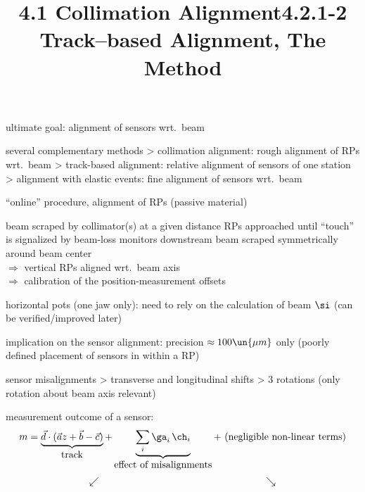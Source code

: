 \> ultimate goal: alignment of sensors wrt.\ beam

\vfil

\> several complementary methods
\>> collimation alignment: rough alignment of RPs wrt.~beam
\>> track-based alignment: relative alignment of sensors of one station
\>> alignment with elastic events: fine alignment of sensors wrt.~beam

\newpage%
\title{4.1 Collimation Alignment}

\> ``online'' procedure, alignment of RPs (passive material)

\> beam scraped by collimator(s) at a given distance
\> RPs approached until ``touch'' is signalized by beam-loss monitors downstream
\> beam scraped symmetrically around beam center\\
$\Rightarrow$ vertical RPs aligned wrt.~beam axis\\
$\Rightarrow$ calibration of the position-measurement offsets


\> horizontal pots (one jaw only): need to rely on the calculation of beam $\si$ (can be verified/improved later)

\> implication on the sensor alignment: precision $\approx 100\un{\mu m}$ only (poorly defined placement of sensors in within a RP)

\newpage%
\title{4.2.1-2 Track--based Alignment, The Method}

\> sensor misalignments
\>> transverse and longitudinal shifts
\>> 3 rotations (only rotation about beam axis relevant) 


\> measurement outcome of a sensor:
$$m = \underbrace{\vec d\cdot(\vec a z + \vec b - \vec c)}_{\hbox{track}} + \underbrace{\sum_i \ga_i\,\ch_i}_{\hbox{effect of misalignments}} + \hbox{ (negligible non-linear terms)}$$
\vskip-4mm
$$\swarrow \hskip6cm \searrow$$



